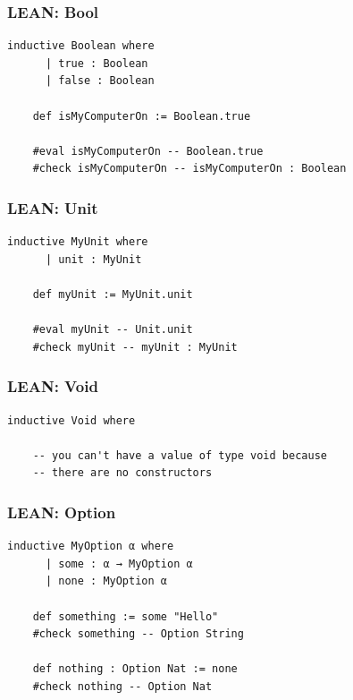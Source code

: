 \documentclass{beamer}
\begin{document}
\begin{frame}[fragile]
  \frametitle{LEAN: Bool}

  \begin{lstlisting}[language=lean]
    inductive Boolean where
      | true : Boolean
      | false : Boolean

    def isMyComputerOn := Boolean.true

    #eval isMyComputerOn -- Boolean.true
    #check isMyComputerOn -- isMyComputerOn : Boolean
  \end{lstlisting}
\end{frame}

\begin{frame}[fragile]
  \frametitle{LEAN: Unit}

  \begin{lstlisting}[language=lean]
    inductive MyUnit where
      | unit : MyUnit

    def myUnit := MyUnit.unit

    #eval myUnit -- Unit.unit
    #check myUnit -- myUnit : MyUnit
  \end{lstlisting}
\end{frame}

\begin{frame}[fragile]
  \frametitle{LEAN: Void}

  \begin{lstlisting}[language=lean]
    inductive Void where

    -- you can't have a value of type void because
    -- there are no constructors
  \end{lstlisting}
\end{frame}

\begin{frame}[fragile]
  \frametitle{LEAN: Option}

  \begin{lstlisting}[language=lean]
    inductive MyOption α where
      | some : α → MyOption α
      | none : MyOption α

    def something := some "Hello"
    #check something -- Option String

    def nothing : Option Nat := none
    #check nothing -- Option Nat
  \end{lstlisting}
\end{frame}
\end{document}
